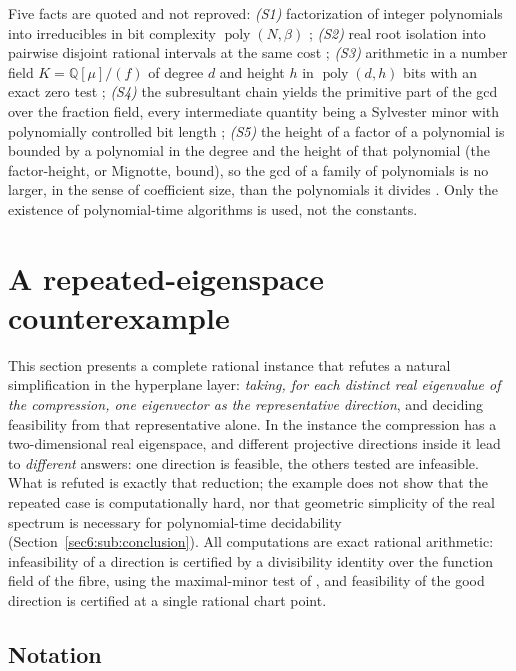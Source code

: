 \documentclass[journal]{IEEEtran}
\theoremstyle{plainn}
\theoremstyle{remark}
\newcommand{\poly}{\operatorname{poly}}
\begin{document}
Five facts are quoted and not reproved: \emph{(S1)} factorization of integer polynomials into
irreducibles in bit complexity $\poly(N,\beta)$ \cite{vzgg03}; \emph{(S2)} real root isolation into
pairwise disjoint rational intervals at the same cost \cite{bpr06}; \emph{(S3)} arithmetic in a number
field $K=\mathbb{Q}[\mu]/(f)$ of degree $d$ and height $h$ in $\poly(d,h)$ bits with an exact zero
test \cite{lan02,vzgg03}; \emph{(S4)} the subresultant chain yields the primitive part of the gcd over
the fraction field, every intermediate quantity being a Sylvester minor with polynomially controlled
bit length \cite{vzgg03}; \emph{(S5)} the height of a factor of a polynomial is bounded by a polynomial
in the degree and the height of that polynomial (the factor-height, or Mignotte, bound), so the gcd of
a family of polynomials is no larger, in the sense of coefficient size, than the polynomials it divides
\cite{vzgg03,lan02}. Only the existence of polynomial-time algorithms is used, not the constants.

\section{A repeated-eigenspace counterexample}\label{sec:counterexample}

This section presents a complete rational instance that refutes a natural simplification in the
hyperplane layer: \emph{taking, for each distinct real eigenvalue of the compression, one eigenvector as
the representative direction}, and deciding feasibility from that representative alone. In the instance
the compression has a two-dimensional real eigenspace, and different projective directions inside it
lead to \emph{different} answers: one direction is feasible, the others tested are infeasible. What is
refuted is exactly that reduction; the example does not show that the repeated case is computationally
hard, nor that geometric simplicity of the real spectrum is necessary for polynomial-time decidability
(Section~\ref{sec6:sub:conclusion}). All computations are exact rational arithmetic: infeasibility of a
direction is certified by a divisibility identity over the function field of the fibre, using the
maximal-minor test of \cite{companion1}, and feasibility of the good direction is certified at a single
rational chart point.

\subsection{Notation}\label{sec6:sub:notation}
\end{document}

